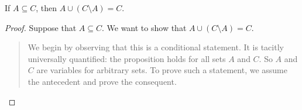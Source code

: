 \documentclass[../../../include/open-logic-section]{subfiles}
\begin{document}


\begin{prop}
If $A \subseteq C$, then $A \cup (C \setminus A) = C$.
\end{prop}  

\begin{proof}
  Suppose that $A \subseteq C$.  We want to show that $A \cup (C
  \setminus A) = C$.
  \begin{quote}
    We begin by observing that this is a conditional statement. It is
    tacitly universally quantified: the proposition holds for all sets
    $A$ and $C$. So $A$ and $C$ are variables for arbitrary sets. To
    prove such a statement, we assume the antecedent and prove the
    consequent.


\end{quote}
\end{proof}
\end{document}
